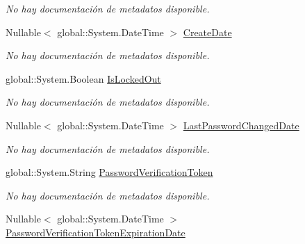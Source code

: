 \begin{DoxyCompactItemize}
\begin{DoxyCompactList}\small\item\em No hay documentación de metadatos disponible. \end{DoxyCompactList}\item 
Nullable$<$ global\-::\-System.\-Date\-Time $>$ \hyperlink{class_microsoft_1_1_samples_1_1_kinect_1_1_basic_interactions_1_1_users_a91295b3f7d493006770a5b131cdf23ea}{Create\-Date}
\begin{DoxyCompactList}\small\item\em No hay documentación de metadatos disponible. \end{DoxyCompactList}\item 
global\-::\-System.\-Boolean \hyperlink{class_microsoft_1_1_samples_1_1_kinect_1_1_basic_interactions_1_1_users_a6ff5155691e87585c660347a1311eaac}{Is\-Locked\-Out}
\begin{DoxyCompactList}\small\item\em No hay documentación de metadatos disponible. \end{DoxyCompactList}\item 
Nullable$<$ global\-::\-System.\-Date\-Time $>$ \hyperlink{class_microsoft_1_1_samples_1_1_kinect_1_1_basic_interactions_1_1_users_a23caa125a4d85cfa6c02e99612cd8462}{Last\-Password\-Changed\-Date}
\begin{DoxyCompactList}\small\item\em No hay documentación de metadatos disponible. \end{DoxyCompactList}\item 
global\-::\-System.\-String \hyperlink{class_microsoft_1_1_samples_1_1_kinect_1_1_basic_interactions_1_1_users_a8c854f90ede7b1c6ab9636890773f698}{Password\-Verification\-Token}
\begin{DoxyCompactList}\small\item\em No hay documentación de metadatos disponible. \end{DoxyCompactList}\item 
Nullable$<$ global\-::\-System.\-Date\-Time $>$ \hyperlink{class_microsoft_1_1_samples_1_1_kinect_1_1_basic_interactions_1_1_users_ad6271afccd035474700b9f128955d464}{Password\-Verification\-Token\-Expiration\-Date}

\end{DoxyCompactItemize}
